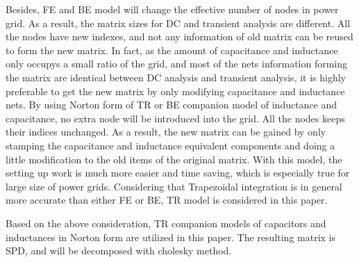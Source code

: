 Besides, FE and BE model will change the effective number of nodes in power grid. As a result, the matrix sizes for DC and transient analysis are different. All the nodes have new indexes, and not any information of old matrix can be reused to form the new matrix. In fact, as 
the amount of capacitance and inductance only occupys a small ratio of the grid, and most of the nets
information forming the matrix are identical between DC analysis and transient analysis, it is highly preferable to get the new matrix by
only modifying capacitance and inductance nets. By using Norton form of TR or BE companion model of inductance and capacitance, no extra 
node 
will be introduced into the grid. All the nodes keeps their indices unchanged. As a result, the new matrix can be gained by only stamping
the capacitance and inductance equivalent components and doing a little modification to the old items of the original matrix. With this
model, the setting up work is much more easier and time saving, which is especially true for large size of power grids. Considering that 
Trapezoidal integration is in general more accurate than either FE or BE\cite{ECE552}, TR model is considered in this paper.

Based on the above consideration, TR companion models of capacitors and inductances in Norton form are utilized in this paper. The 
resulting matrix is SPD, and will be decomposed with cholesky method.